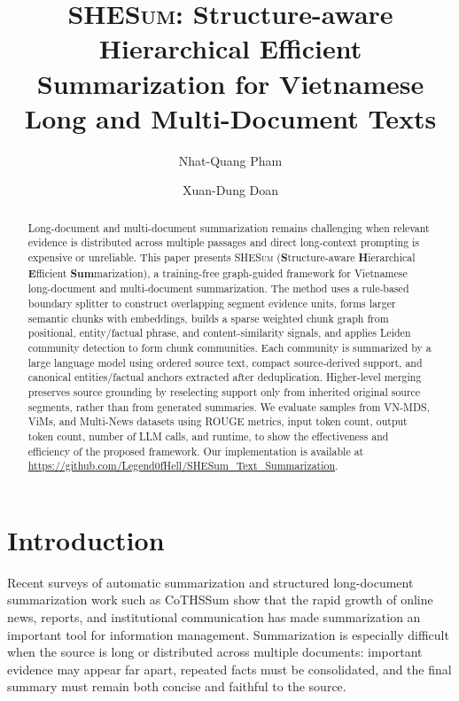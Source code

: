 \documentclass[11pt]{article}
\title{\textsc{SHESum}: Structure-aware Hierarchical Efficient Summarization for Vietnamese Long and Multi-Document Texts}
\author[1]{Nhat-Quang Pham}
\author[2]{Xuan-Dung Doan}
\affil[1]{University of Engineering and Technology - VNU, Vietnam \\ \texttt{pnquang05@gmail.com}}
\affil[2]{Viettel Artificial Intelligence Center, Viettel Group, Vietnam \\ \texttt{dungdx4@viettel.com.vn}}
\newcommand{\methodname}{\textsc{SHESum}}
\begin{document}
\maketitle

\begin{abstract}
Long-document and multi-document summarization remains challenging when relevant evidence is distributed across multiple passages and direct long-context prompting is expensive or unreliable. This paper presents \methodname{} (\textbf{S}tructure-aware \textbf{H}ierarchical \textbf{E}fficient \textbf{Sum}marization), a training-free graph-guided framework for Vietnamese long-document and multi-document summarization. The method uses a rule-based boundary splitter to construct overlapping segment evidence units, forms larger semantic chunks with embeddings, builds a sparse weighted chunk graph from positional, entity/factual phrase, and content-similarity signals, and applies Leiden community detection to form chunk communities. Each community is summarized by a large language model using ordered source text, compact source-derived support, and canonical entities/factual anchors extracted after deduplication. Higher-level merging preserves source grounding by reselecting support only from inherited original source segments, rather than from generated summaries. We evaluate samples from VN-MDS, ViMs, and Multi-News datasets using ROUGE metrics, input token count, output token count, number of LLM calls, and runtime, to show the effectiveness and efficiency of the proposed framework. Our implementation is available at \url{https://github.com/Legend0fHell/SHESum_Text_Summarization}.

\end{abstract}

\section{Introduction}
\label{sec:introduction}

Recent surveys of automatic summarization \citep{zhang2025comprehensivesurveyprocessorientedautomatic} and structured long-document summarization work such as CoTHSSum \citep{chen-2025-cothssum} show that the rapid growth of online news, reports, and institutional communication has made summarization an important tool for information management. Summarization is especially difficult when the source is long or distributed across multiple documents: important evidence may appear far apart, repeated facts must be consolidated, and the final summary must remain both concise and faithful to the source.
\end{document}
